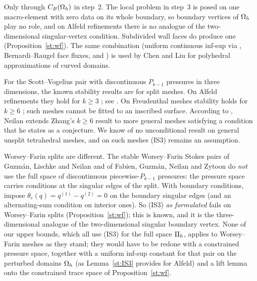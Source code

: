 \begin{remark}\label{st:rem:chenliu}
Only through $C_B(\Omega_h)$ in step~2. The local problem in step~3 is posed on one macro-element with zero data on its whole boundary, so boundary vertices of $\Omega_h$ play no role, and on Alfeld refinements there is no analogue of the two-dimensional singular-vertex condition. Subdivided wall faces do produce one (Proposition~\ref{st:wf}). The same combination (uniform continuous inf-sup via \cite{BCDG2016}, Bernardi--Raugel face fluxes, and \cite[Theorem~3.1]{GuzmanNeilan2018}) is used by Chen and Liu \cite[Lemma~3.9]{ChenLiu2026} for polyhedral approximations of curved domains.
\end{remark}

\begin{remark}\label{st:rem:status}
For the Scott--Vogelius pair with discontinuous $P_{k-1}$ pressures in three dimensions, the known stability results are for split meshes. On Alfeld refinements they hold for $k\ge3$ \cite{Zhang2005,GuzmanNeilan2018}; see \cite[Table~2.1]{FarrellMitchellScott2024}. On Freudenthal meshes stability holds for $k\ge6$ \cite{Zhang2011}; such meshes cannot be fitted to an inscribed surface. According to \cite{FarrellMitchellScott2024}, Neilan \cite[Proposition~6.5]{Neilan2015} extends Zhang's $k\ge6$ result to more general meshes satisfying a condition that he states as a conjecture. We know of no unconditional result on general unsplit tetrahedral meshes, and on such meshes (IS3) remains an assumption. %

Worsey--Farin splits are different. The stable Worsey--Farin Stokes pairs of Guzm\'an, Lischke and Neilan \cite{GuzmanLischkeNeilan2022} and of Fabien, Guzm\'an, Neilan and Zytoon \cite{FabienGuzmanNeilanZytoon2022} do \emph{not} use the full space of discontinuous piecewise-$P_{k-1}$ pressures: the pressure space carries conditions at the singular edges of the split. With boundary conditions, \cite{FabienGuzmanNeilanZytoon2022} impose $\theta_e(q)=q^{(1)}-q^{(2)}=0$ on the boundary singular edges (and an alternating-sum condition on interior ones). %
So (IS3) \emph{as formulated} fails on Worsey--Farin splits (Proposition~\ref{st:wf}); this is known, and it is the three-dimensional analogue of the two-dimensional singular boundary vertex. None of our upper bounds, which all use (IS3) for the full space $\Pi_h$, applies to Worsey--Farin meshes as they stand; they would have to be redone with a constrained pressure space, together with a uniform inf-sup constant for that pair on the perturbed domains $\Omega_h$ (as Lemma~\ref{st:IS3} provides for Alfeld) and a lift lemma onto the constrained trace space of Proposition~\ref{st:wf}.
\end{remark}


